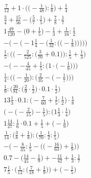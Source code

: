 \documentclass[8pt]{article}
\begin{document}
\begin{align}
\frac{7}{12} + 1 \cdot \Big(\big(-\frac{1}{48}\big) : \frac{1}{8}\Big) + \frac{1}{4} \\
\frac{3}{4} + \frac{15}{56} - \big(\frac{5}{7} \cdot \frac{1}{5}\big) + \frac{7}{8} \cdot \frac{1}{7} \\
1\frac{49}{120} - \big(0 + \frac{1}{5}\big) - \frac{1}{3} + \frac{1}{16} : \frac{1}{2} \\
-\Bigg(-\Bigg(-1\frac{1}{4} - \bigg(\frac{1}{32} : \Big(\big(-\frac{1}{8}\big)\Big)\bigg)\Bigg)\Bigg) \\
\frac{1}{5} : \bigg(\Big(-\frac{2}{525} : \big(\frac{3}{70} + 0.1\big)\Big) : \frac{1}{5} + \frac{1}{3}\bigg) \\
-\bigg(--\frac{4}{45} + \frac{1}{5} : \Big(1 \cdot \big(-\frac{1}{9}\big)\Big)\bigg) \\
\frac{1}{4} : \bigg(\Big(-\frac{1}{20}\Big) : \Big(\frac{2}{35} - \big(-\frac{1}{7}\big)\Big)\bigg) \\
\frac{1}{9} : \Big(\frac{20}{81} : \big(\frac{2}{9} \cdot \frac{1}{2}\big) \cdot 0.1 \cdot \frac{1}{2}\Big) \\
13\frac{1}{3} \cdot 0.1 : \big(-\frac{7}{60} + \frac{1}{5} : \frac{1}{2}\big) \cdot \frac{1}{8} \\
\Big(-\big(-\frac{2}{15}\big) - \frac{1}{5}\Big) : \Big(1\frac{1}{3} \cdot \frac{1}{4}\Big) \\
1\frac{14}{27} : \frac{1}{6} \cdot 0.1 + \frac{1}{5} + \big(-\frac{1}{9}\big) \\
\frac{1}{14} : \big(\frac{3}{8} + \frac{1}{8}\big) : \big(\frac{1}{70} : \frac{1}{2} : \frac{1}{5}\big) \\
-\bigg(-\frac{8}{35} : \frac{1}{5} - \Big(\big(-\frac{16}{63}\big) + \frac{1}{9}\Big)\bigg) \\
0.7 - \big(\frac{14}{45} - \frac{1}{9}\big) + -\frac{11}{42} + \frac{1}{3} : \frac{1}{7} \\
7\frac{1}{5} \cdot \Big(\frac{1}{12} : \big(\frac{7}{18} + \frac{1}{9}\big)\Big) + \Big(-\frac{1}{5}\Big)
\end{align}
\end{document}
